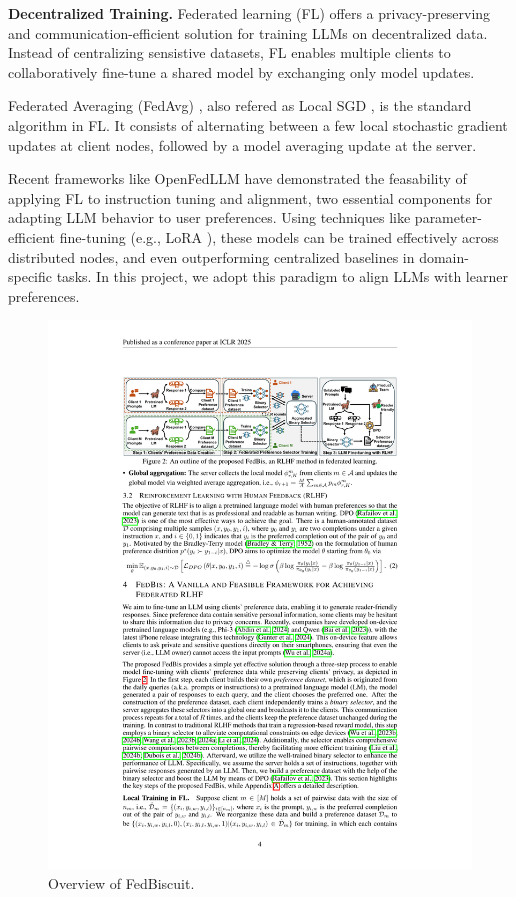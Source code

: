 \documentclass[sigconf]{acmart}
\begin{document}
\textbf{Decentralized Training.} Federated learning (FL) \cite{mcmahan2023communicationefficientlearningdeepnetworks} offers a privacy-preserving and communication-efficient solution for training LLMs on decentralized data. Instead of centralizing sensistive datasets, FL enables multiple clients to collaboratively fine-tune a shared model by exchanging only model updates. 

Federated Averaging (FedAvg) \cite{mcmahan2023communicationefficientlearningdeepnetworks}, also refered as Local SGD \cite{stich2019localsgdconvergesfast}, is the standard algorithm in FL. It consists of alternating between a few local
stochastic gradient updates at client nodes, followed by a model averaging update at the server.

Recent frameworks like OpenFedLLM \cite{ye2024openfedllmtraininglargelanguage} have demonstrated the feasability of applying FL to instruction tuning and alignment, two essential components for adapting LLM behavior to user preferences. Using techniques like parameter-efficient fine-tuning (e.g., LoRA \cite{hu2021loralowrankadaptationlarge}), these models can be trained effectively across distributed nodes, and even outperforming centralized baselines in domain-specific tasks. In this project, we adopt this paradigm to align LLMs with learner preferences.

\begin{figure}
	\includegraphics[width=\textwidth]{fedbiscuit-overview}
  \caption{Overview of FedBiscuit.}
  \label{fig:overview}
\end{figure}
\end{document}
